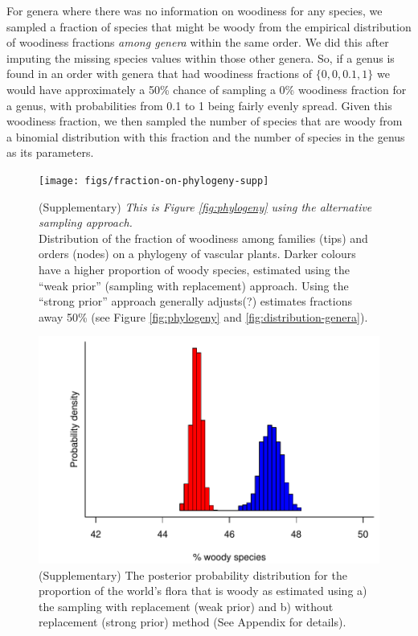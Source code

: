 \documentclass[12pt]{article}
\begin{document}
For genera where there was no information on woodiness for any
species, we sampled a fraction of species that might be woody from the
empirical distribution of woodiness fractions \textit{among genera}
within the same order. We did this after imputing the missing species
values within those other genera. So, if a genus is found in an order
with genera that had woodiness fractions of $\{0, 0, 0.1, 1\}$ we would
have approximately a 50\% chance of sampling a 0\% woodiness fraction
for a genus, with probabilities from 0.1 to 1 being fairly evenly
spread.  Given this woodiness fraction, we then sampled the number of
species that are woody from a binomial distribution with this fraction
and the number of species in the genus as its parameters.

\begin{figure}[p]
  \centering
  \texttt{[image: figs/fraction-on-phylogeny-supp]}

  \caption{(Supplementary)
    \textit{This is Figure \ref{fig:phylogeny} using the alternative
      sampling approach.}\\
    Distribution of the fraction of woodiness among families
    (tips) and orders (nodes) on a phylogeny of vascular plants.
    Darker colours have a higher proportion of woody species,
    estimated using the ``weak prior'' (sampling with
    replacement) approach.  Using the ``strong prior'' approach
    generally adjusts(?) estimates fractions away 50\% (see Figure
    \ref{fig:phylogeny} and \ref{fig:distribution-genera}).
    }
\label{fig:phylogeny-supp}
\end{figure}

\begin{figure}[p]
  \centering
  \includegraphics{figs/distribution-raw}  
  \caption{(Supplementary) The posterior probability distribution for
    the proportion of the world's flora that is woody as estimated
    using a) the sampling with replacement (weak prior) and b) without
    replacement (strong prior) method (See Appendix for details).}
  \label{fig:distribution-raw}
\end{figure}
\end{document}
